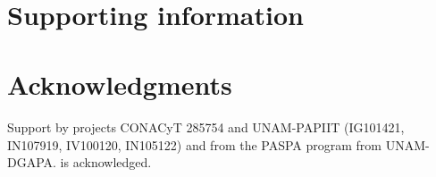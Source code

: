 \documentclass[10pt,letterpaper]{article} %
\begin{document}
\



\section*{Supporting information} %
\section*{Acknowledgments} %

\nolinenumbers

Support by projects CONACyT 285754 and UNAM-PAPIIT (IG101421, IN107919, IV100120, IN105122) and from the PASPA program from UNAM-DGAPA. is acknowledged. 
 
\end{document}
